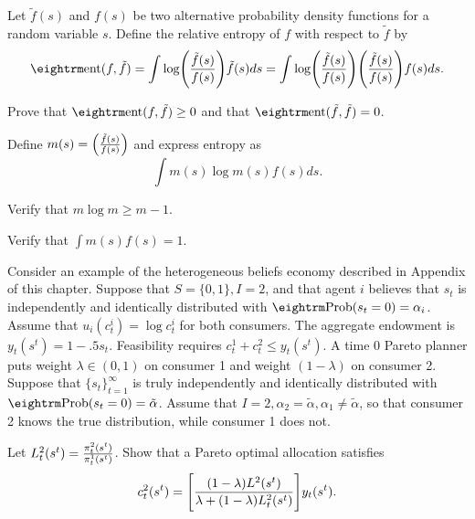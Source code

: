 \medskip

 

\medskip

\noindent
Let $\tilde f(s)$ and $f(s)$ be two alternative probability density functions for a random variable $s$.
Define the relative entropy of $f$ with respect to $\tilde f$ by
$$ {\rm ent} (f, \tilde f) = \int \log \Biggl( { \tilde f(s) \over f(s)  }\Biggr) \tilde f(s) d s = \int \log \Biggl( { \tilde f(s) \over f(s)  }\Biggr) \Biggl( { \tilde f(s) \over f(s)  }\Biggr)
f(s) d s .$$

\medskip
\noindent Prove that ${\rm ent} (f, \tilde f) \geq 0$ and that ${\rm ent} (\tilde f, \tilde f) = 0$.

\medskip

  Define $m(s)  = \Bigl( { \tilde f(s) \over f(s)  }\Bigr)$ and express entropy
as
$$ \int m(s) \log m(s) f(s) ds .$$

\medskip

  Verify that $m \log m \geq m - 1 $.

\medskip

 Verify that $\int m (s) f(s) = 1$.

\medskip

 

\medskip

\noindent Consider an example of the heterogeneous beliefs economy described in Appendix   of this  chapter.
Suppose  that $S = \{0, 1\},  I=2$, and that  agent $i$ believes that $s_t$ is independently and identically distributed
with ${\rm Prob}(s_t = 0) = \alpha_i$. Assume that $u_i(c^i_t) = \log c^i_t$ for both consumers. The aggregate endowment is $y_t(s^t) = 1 - .5 s_t$. Feasibility requires
$c_t^1 + c_t^2 \leq y_t(s^t)$.  A time $0$ Pareto planner puts weight $\lambda \in (0,1)$ on consumer 1 and weight $(1-\lambda)$ on consumer 2.
Suppose that $\{s_t\}_{t=1}^\infty$ is truly independently and identically distributed with ${\rm Prob}(s_t = 0) = \tilde \alpha$.
Assume that $I=2, \alpha_2 = \tilde \alpha, \alpha_1 \neq \tilde \alpha$, so that consumer 2 knows the true distribution, while consumer 1 does not.

\medskip

  Let $L^2_t(s^t) = {\pi_t^2(s^t) \over \pi_t^1(s^t)}$.  Show that a Pareto optimal allocation satisfies
$$ c_t^2(s^t) = \Biggl[ { (1-\lambda) L^2(s^t) \over \lambda + (1-\lambda) L_t^2(s^t) } \Biggr] y_t(s^t) .$$

